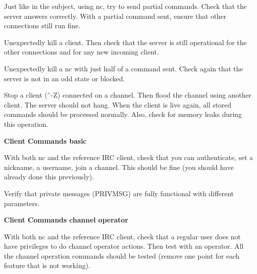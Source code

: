 \begin{DoxyItemize}
\item Just like in the subject, using nc, try to send partial commands. Check that the server answers correctly. With a partial command sent, ensure that other connections still run fine.
\item Unexpectedly kill a client. Then check that the server is still operational for the other connections and for any new incoming client.
\item Unexpectedly kill a nc with just half of a command sent. Check again that the server is not in an odd state or blocked.
\item Stop a client ($^\wedge$-\/Z) connected on a channel. Then flood the channel using another client. The server should not hang. When the client is live again, all stored commands should be processed normally. Also, check for memory leaks during this operation.
\end{DoxyItemize}

{\bfseries{Client Commands basic}}


\begin{DoxyItemize}
\item With both nc and the reference IRC client, check that you can authenticate, set a nickname, a username, join a channel. This should be fine (you should have already done this previously).
\item Verify that private messages (PRIVMSG) are fully functional with different parameters.
\end{DoxyItemize}

{\bfseries{Client Commands channel operator}}


\begin{DoxyItemize}
\item With both nc and the reference IRC client, check that a regular user does not have privileges to do channel operator actions. Then test with an operator. All the channel operation commands should be tested (remove one point for each feature that is not working). 
\end{DoxyItemize}